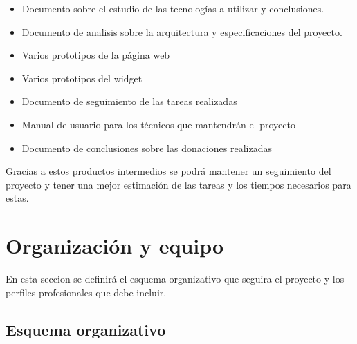 \begin{itemize}
	\item Documento sobre el estudio de las tecnologías a utilizar y conclusiones.
	\item Documento de analisis sobre la arquitectura y especificaciones del proyecto.
	\item Varios prototipos de la página web
	\item Varios prototipos del widget
	\item Documento de seguimiento de las tareas realizadas
	\item Manual de usuario para los técnicos que mantendrán el proyecto
	\item Documento de conclusiones sobre las donaciones realizadas
\end{itemize}

Gracias a estos productos intermedios se podrá mantener un seguimiento del proyecto y tener una mejor estimación de las tareas y los tiempos necesarios para estas.

\section{Organización y equipo}
En esta seccion se definirá el esquema organizativo que seguira el proyecto y los perfiles profesionales que debe incluir.

\subsection{Esquema organizativo}

